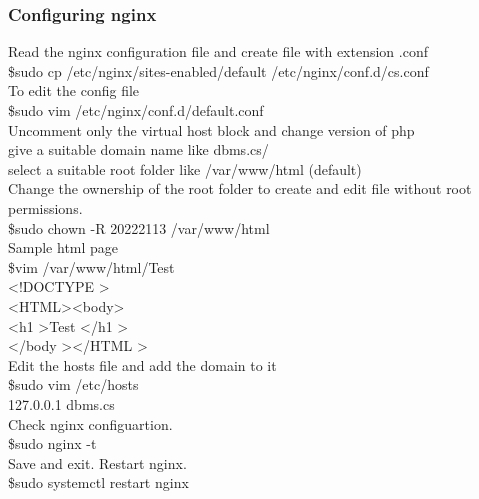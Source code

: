 \documentclass{article}
\begin{document}
\begin{flushleft}
\subsubsection{Configuring nginx}
\textbullet Read the nginx configuration file and create  file with extension .conf\\
\vspace{0.1in}\hspace{0.3in}\$sudo cp /etc/nginx/sites-enabled/default /etc/nginx/conf.d/cs.conf\\
\textbullet To edit the config file\\
\vspace{0.1in}\hspace{0.3in}\$sudo vim /etc/nginx/conf.d/default.conf\\
\textbullet Uncomment only the virtual host block and change version of php\\
give a suitable domain name like dbms.cs/\\
select a suitable root folder like /var/www/html (default)\\
\textbullet Change the ownership of the root folder to create and edit file without root permissions.\\
\vspace{0.1in}\hspace{0.3in}\$sudo chown -R 20222113 /var/www/html\\
\vspace{0.2cm}
\textbullet Sample html page\\
\vspace{0.1in}\hspace{0.3in}\$vim /var/www/html/Test\\
   \textless!DOCTYPE \textgreater \\ \textless HTML\textgreater \textless body\textgreater \\ \textless h1 \textgreater Test \textless /h1 \textgreater \\ \textless/body \textgreater \textless /HTML \textgreater\\
\vspace{0.2cm}
\vspace{0.2cm}
\textbullet Edit the hosts file and add the domain to it\\
\vspace{0.1in}\hspace{0.3in}\$sudo vim /etc/hosts\\
 \vspace{0.1in}\hspace{0.3in}   127.0.0.1   dbms.cs\\
    \vspace{0.2cm}
\textbullet Check nginx configuartion.\\
\vspace{0.1in}\hspace{0.3in}\$sudo nginx -t\\
\textbullet Save and exit. Restart nginx.\\
\vspace{0.1in}\hspace{0.3in}\$sudo systemctl restart nginx\\


\end{flushleft}
\end{document}
